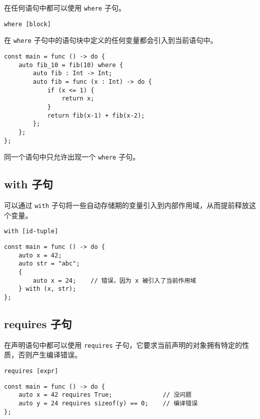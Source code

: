 在任何语句中都可以使用 \lstinline!where! 子句。

\begin{grammar} \label{grm:where-clause}
    \lstinline!where [block]!
\end{grammar}

在 \lstinline!where! 子句中的语句块中定义的任何变量都会引入到当前语句中。

\begin{lstlisting}
const main = func () -> do {
    auto fib_10 = fib(10) where {
        auto fib : Int -> Int;
        auto fib = func (x : Int) -> do {
            if (x <= 1) {
                return x;
            }
            return fib(x-1) + fib(x-2);
        };
    };
};
\end{lstlisting}

同一个语句中只允许出现一个 \lstinline!where! 子句。

\subsection{with 子句}

可以通过 \lstinline!with! 子句将一些自动存储期的变量引入到内部作用域，从而提前释放这个变量。

\begin{grammar} \label{grm:with-clause}
    \lstinline!with [id-tuple]!
\end{grammar}

\begin{lstlisting}
const main = func () -> do {
    auto x = 42;
    auto str = "abc";
    {
        auto x = 24;    // 错误，因为 x 被引入了当前作用域
    } with (x, str);
};
\end{lstlisting}

\subsection{requires 子句}

在声明语句中都可以使用 \lstinline!requires! 子句，它要求当前声明的对象拥有特定的性质，否则产生编译错误。

\begin{grammar} \label{grm:requires-clause}
	\lstinline!requires [expr]!
\end{grammar}

\begin{lstlisting}
const main = func () -> do {
	auto x = 42 requires True;				// 没问题
	auto y = 24 requires sizeof(y) == 0;	// 编译错误
};
\end{lstlisting}



